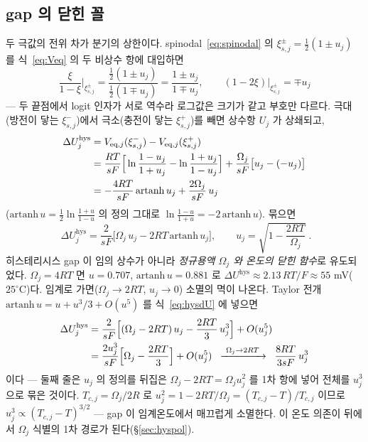 \documentclass[11pt,a4paper]{article}
\newcommand{\eq}{\mathrm{eq}}
\newcommand{\hys}{\mathrm{hys}}
\begin{document}
\subsection{gap 의 닫힌 꼴}
두 극값의 전위 차가 분기의 상한이다. spinodal~\eqref{eq:spinodal} 의
$\xi_{s,j}^\pm=\tfrac12(1\pm u_j)$ 를 식~\eqref{eq:Veq} 의 두 비상수 항에 대입하면
\begin{equation}
\frac{\xi}{1-\xi}\bigg|_{\xi_{s,j}^\pm}
=\frac{\tfrac12(1\pm u_j)}{\tfrac12(1\mp u_j)}
=\frac{1\pm u_j}{1\mp u_j},
\qquad
(1-2\xi)\Big|_{\xi_{s,j}^\pm}=\mp u_j
\label{eq:hyssub}
\end{equation}
— 두 끝점에서 logit 인자가 서로 역수라 로그값은 크기가 같고 부호만 다르다. 극대(방전이 닿는
$\xi_{s,j}^-$)에서 극소(충전이 닿는 $\xi_{s,j}^+$)를 빼면 상수항 $U_j$ 가 상쇄되고,
\begin{align}
\Delta U_j^\hys
&=V_{\eq,j}(\xi_{s,j}^-)-V_{\eq,j}(\xi_{s,j}^+)\notag\\
&=\frac{RT}{sF}\Big[\ln\frac{1-u_j}{1+u_j}-\ln\frac{1+u_j}{1-u_j}\Big]
+\frac{\Omega_j}{sF}\big[u_j-(-u_j)\big]
\label{eq:hysdiff}\\
&=-\frac{4RT}{sF}\,\mathrm{artanh}\,u_j+\frac{2\Omega_j}{sF}\,u_j\notag
\end{align}
($\mathrm{artanh}\,u=\tfrac12\ln\tfrac{1+u}{1-u}$ 의 정의 그대로
$\ln\tfrac{1-u}{1+u}=-2\,\mathrm{artanh}\,u$). 묶으면
\begin{equation}
\boxed{\;\Delta U_j^\hys
=\frac{2}{sF}\Big[\Omega_j\,u_j-2RT\,\mathrm{artanh}\,u_j\Big],\qquad
u_j=\sqrt{1-\frac{2RT}{\Omega_j}}\;.}
\label{eq:hysdU}
\end{equation}
히스테리시스 gap 이 임의 상수가 아니라 \emph{정규용액 $\Omega_j$ 와 온도의 닫힌 함수}로 유도되었다.
$\Omega_j=4RT$ 면 $u=0.707$, $\mathrm{artanh}\,u=0.881$ 로 $\Delta U^\hys\approx2.13\,RT/F\approx55$
mV($25^\circ$C)다. 임계로 가면($\Omega_j\to2RT$, $u_j\to0$) 소멸의 멱이 나온다. Taylor 전개
$\mathrm{artanh}\,u=u+u^3/3+O(u^5)$ 를 식~\eqref{eq:hysdU} 에 넣으면
\begin{align}
\Delta U_j^\hys
&=\frac{2}{sF}\Big[(\Omega_j-2RT)\,u_j-\frac{2RT}{3}\,u_j^3\Big]+O(u_j^5)\notag\\
&=\frac{2u_j^3}{sF}\Big[\Omega_j-\frac{2RT}{3}\Big]+O(u_j^5)
\;\;\xrightarrow{\ \Omega_j\to2RT\ }\;\;\frac{8RT}{3sF}\,u_j^3
\label{eq:hyscrit}
\end{align}
이다 — 둘째 줄은 $u_j$ 의 정의를 뒤집은 $\Omega_j-2RT=\Omega_ju_j^2$ 를 1차 항에 넣어 전체를
$u_j^3$ 으로 묶은 것이다. $T_{c,j}=\Omega_j/2R$ 로 $u_j^2=1-2RT/\Omega_j=(T_{c,j}-T)/T_{c,j}$
이므로 $u_j^3\propto(T_{c,j}-T)^{3/2}$ — gap 이 임계온도에서 매끄럽게 소멸한다. 이 온도 의존이
뒤에서 $\Omega_j$ 식별의 1차 경로가 된다(\S\ref{sec:hyspol}).
\end{document}
